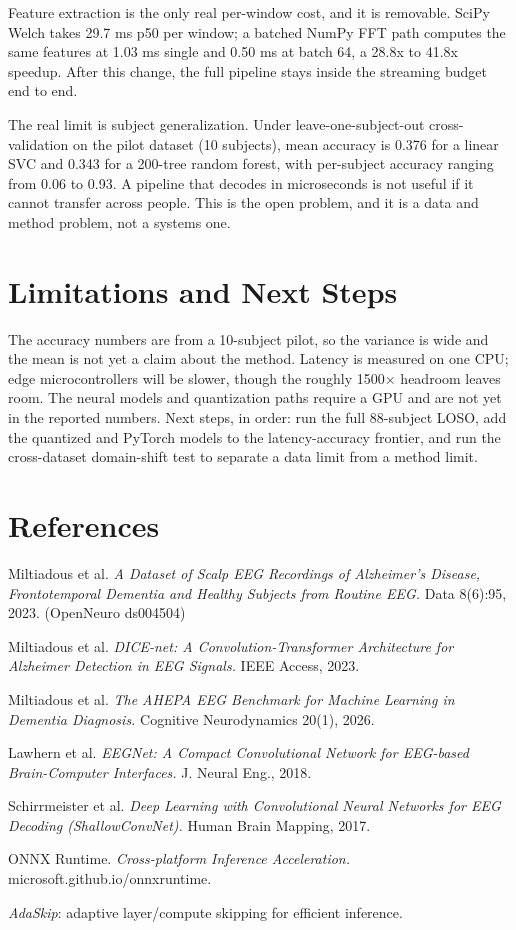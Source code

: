 \documentclass[10pt,twocolumn]{article}
\begin{document}
Feature extraction is the only real per-window cost, and it is removable. SciPy
Welch takes 29.7 ms p50 per window; a batched NumPy FFT path computes the same
features at 1.03 ms single and 0.50 ms at batch 64, a 28.8x to 41.8x speedup.
After this change, the full pipeline stays inside the streaming budget end to end.

The real limit is subject generalization. Under leave-one-subject-out
cross-validation on the pilot dataset (10 subjects), mean accuracy is 0.376 for a
linear SVC and 0.343 for a 200-tree random forest, with per-subject accuracy
ranging from 0.06 to 0.93. A pipeline that decodes in microseconds is not useful
if it cannot transfer across people. This is the open problem, and it is a data
and method problem, not a systems one.

\section{Limitations and Next Steps}
The accuracy numbers are from a 10-subject pilot, so the variance is wide and the
mean is not yet a claim about the method. Latency is measured on one CPU; edge
microcontrollers will be slower, though the roughly 1500$\times$ headroom leaves
room. The
neural models and quantization paths require a GPU and are not yet in the
reported numbers. Next steps, in order: run the full 88-subject LOSO, add the
quantized and PyTorch models to the latency-accuracy frontier, and run the
cross-dataset domain-shift test to separate a data limit from a method limit.

\section*{References}
\small
\begin{enumerate}[label={[\arabic*]}]
\item Miltiadous et al. \emph{A Dataset of Scalp EEG Recordings of Alzheimer's
Disease, Frontotemporal Dementia and Healthy Subjects from Routine EEG.} Data 8(6):95, 2023. (OpenNeuro ds004504)
\item Miltiadous et al. \emph{DICE-net: A Convolution-Transformer Architecture for
Alzheimer Detection in EEG Signals.} IEEE Access, 2023.
\item Miltiadous et al. \emph{The AHEPA EEG Benchmark for Machine Learning in
Dementia Diagnosis.} Cognitive Neurodynamics 20(1), 2026.
\item Lawhern et al. \emph{EEGNet: A Compact Convolutional Network for EEG-based
Brain-Computer Interfaces.} J. Neural Eng., 2018.
\item Schirrmeister et al. \emph{Deep Learning with Convolutional Neural Networks
for EEG Decoding (ShallowConvNet).} Human Brain Mapping, 2017.
\item ONNX Runtime. \emph{Cross-platform Inference Acceleration.} microsoft.github.io/onnxruntime.
\item \emph{AdaSkip}: adaptive layer/compute skipping for efficient inference.
\end{enumerate}
\end{document}
